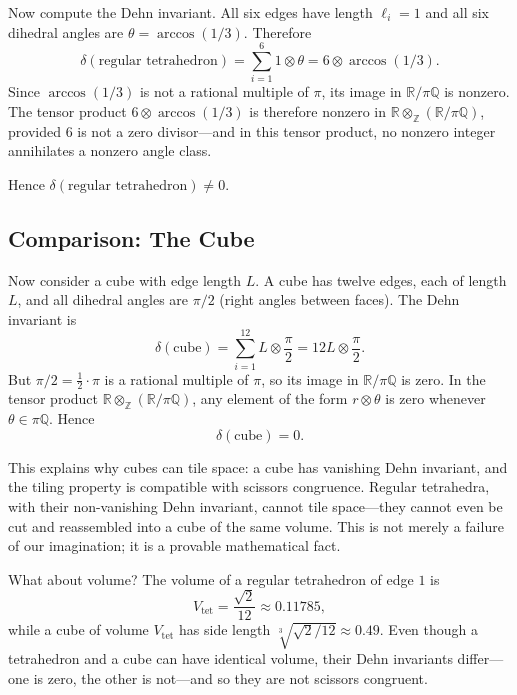 Now compute the Dehn invariant. All six edges have length $\ell_i = 1$ and all six dihedral angles are $\theta = \arccos(1/3)$. Therefore
\[
\delta(\text{regular tetrahedron}) = \sum_{i=1}^{6} 1 \otimes \theta = 6 \otimes \arccos(1/3).
\]
Since $\arccos(1/3)$ is not a rational multiple of $\pi$, its image in $\mathbb{R}/\pi\mathbb{Q}$ is nonzero. The tensor product $6 \otimes \arccos(1/3)$ is therefore nonzero in $\mathbb{R} \otimes_{\mathbb{Z}} (\mathbb{R}/\pi\mathbb{Q})$, provided $6$ is not a zero divisor---and in this tensor product, no nonzero integer annihilates a nonzero angle class.

Hence $\delta(\text{regular tetrahedron}) \neq 0$.

\subsection{Comparison: The Cube}

Now consider a cube with edge length $L$. A cube has twelve edges, each of length $L$, and all dihedral angles are $\pi/2$ (right angles between faces). The Dehn invariant is
\[
\delta(\text{cube}) = \sum_{i=1}^{12} L \otimes \frac{\pi}{2}
= 12L \otimes \frac{\pi}{2}.
\]
But $\pi/2 = \frac12 \cdot \pi$ is a rational multiple of $\pi$, so its image in $\mathbb{R}/\pi\mathbb{Q}$ is zero. In the tensor product $\mathbb{R} \otimes_{\mathbb{Z}} (\mathbb{R}/\pi\mathbb{Q})$, any element of the form $r \otimes \theta$ is zero whenever $\theta \in \pi\mathbb{Q}$. Hence
\[
\delta(\text{cube}) = 0.
\]

\begin{remark}
This explains why cubes can tile space: a cube has vanishing Dehn invariant, and the tiling property is compatible with scissors congruence. Regular tetrahedra, with their non-vanishing Dehn invariant, cannot tile space---they cannot even be cut and reassembled into a cube of the same volume. This is not merely a failure of our imagination; it is a provable mathematical fact.
\end{remark}

What about volume? The volume of a regular tetrahedron of edge $1$ is
\[
V_{\text{tet}} = \frac{\sqrt2}{12} \approx 0.11785,
\]
while a cube of volume $V_{\text{tet}}$ has side length $\sqrt[3]{\sqrt2/12} \approx 0.49$. Even though a tetrahedron and a cube can have identical volume, their Dehn invariants differ---one is zero, the other is not---and so they are not scissors congruent.

